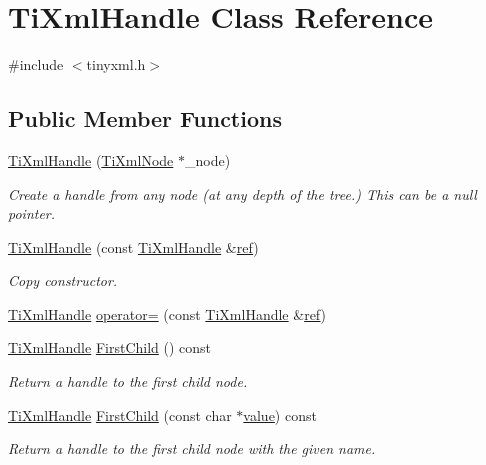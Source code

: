\hypertarget{class_ti_xml_handle}{\section{Ti\-Xml\-Handle Class Reference}
\label{class_ti_xml_handle}
}


{\ttfamily \#include $<$tinyxml.\-h$>$}

\subsection*{Public Member Functions}
\begin{DoxyCompactItemize}
\item 
\hyperlink{class_ti_xml_handle_aba18fd7bdefb942ecdea4bf4b8e29ec8}{Ti\-Xml\-Handle} (\hyperlink{class_ti_xml_node}{Ti\-Xml\-Node} $\ast$\-\_\-node)
\begin{DoxyCompactList}\small\item\em Create a handle from any node (at any depth of the tree.) This can be a null pointer. \end{DoxyCompactList}\item 
\hyperlink{class_ti_xml_handle_a236d7855e1e56ccc7b980630c48c7fd7}{Ti\-Xml\-Handle} (const \hyperlink{class_ti_xml_handle}{Ti\-Xml\-Handle} \&\hyperlink{glew_8h_a9bc95f53c534e72c324e3e8caadb6f1e}{ref})
\begin{DoxyCompactList}\small\item\em Copy constructor. \end{DoxyCompactList}\item 
\hyperlink{class_ti_xml_handle}{Ti\-Xml\-Handle} \hyperlink{class_ti_xml_handle_ad8e5dcf6a87882674203157f29f8e4db}{operator=} (const \hyperlink{class_ti_xml_handle}{Ti\-Xml\-Handle} \&\hyperlink{glew_8h_a9bc95f53c534e72c324e3e8caadb6f1e}{ref})
\item 
\hyperlink{class_ti_xml_handle}{Ti\-Xml\-Handle} \hyperlink{class_ti_xml_handle_acdb1faaf88a700b40ca2c8d9aee21139}{First\-Child} () const 
\begin{DoxyCompactList}\small\item\em Return a handle to the first child node. \end{DoxyCompactList}\item 
\hyperlink{class_ti_xml_handle}{Ti\-Xml\-Handle} \hyperlink{class_ti_xml_handle_a8c61f64ae9365d89c264f289085541f8}{First\-Child} (const char $\ast$\hyperlink{fmod__dsp_8h_a6a4f8a1a444e9080b297963b3db29fe0}{value}) const 
\begin{DoxyCompactList}\small\item\em Return a handle to the first child node with the given name. \end{DoxyCompactList}\item 

\end{DoxyCompactItemize}
